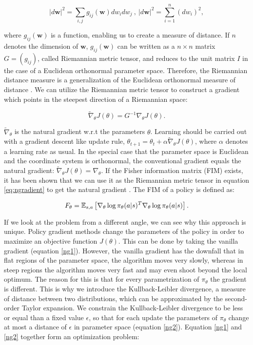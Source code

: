 \begin{equation}
	\label{eq:riem}
	|d\textbf{w}|^2 = \sum_{i,j}g_{ij}(\textbf{w}) dw_i dw_j ~,~ |d\textbf{w}|^2 = \sum_{i=1}^{n}(dw_i)^2,
\end{equation}

\noindent where $g_{ij}(\textbf{w})$ is a function, enabling us to create a measure of distance. If $n$ denotes the dimension of $\textbf{w}$, $g_{ij}(\textbf{w})$ can be written as a $n \times n$ matrix $G = (g_{ij})$, called Riemannian metric tensor, and reduces to the unit matrix $I$ in the case of a Euclidean orthonormal parameter space. Therefore, the Riemannian distance measure is a generalization of the Euclidean orthonormal measure of distance \citep{amari1998natural, haykin2009neural}. We can utilize the Riemannian metric tensor to construct a gradient which points in the steepest direction of a Riemannian space:

\begin{equation}
	\label{eq:ngradient}
	\widetilde{\nabla}_{\theta} J(\theta) = G^{-1} \nabla_\theta J(\theta).
\end{equation}

\noindent $\widetilde{\nabla}_{\theta}$ is the natural gradient w.r.t the parameters $\theta$.  Learning should be carried out with a gradient descent like update rule, $\theta_{t+1} = \theta_{t} + \alpha \widetilde{\nabla}_{\theta} J(\theta)$, where $\alpha$ denotes a learning rate as usual. In the special case that the parameter space is Euclidean and the coordinate system is orthonormal, the conventional gradient equals the natural gradient: $\widetilde{\nabla}_{\theta} J(\theta) = \nabla_{\theta}$.
If the Fisher information matrix (FIM) exists, it has been shown that we can use it as the Riemannian metric tensor in equation \ref{eq:ngradient} to get the natural gradient \citep{amari1998efficiently, peters2008natural}. The FIM of a policy is defined as:

\begin{equation}
	F_\theta=\operatorname{\mathbb{E}}_{s,a}\left[\nabla_{\theta}\log\pi_{\theta}(a|s)^{T}\nabla_{\theta}\log\pi_{\theta}(a|s)\right].
\end{equation}

\noindent If we look at the problem from a different angle, we can see why this approach is unique. Policy gradient methods change the parameters of the policy in order to maximize an objective function $J(\theta)$. This can be done by taking the vanilla gradient (equation \ref{ng1}). However, the vanilla gradient has the downfall that in flat regions of the parameter space, the algorithm moves very slowly, whereas in steep regions the algorithm moves very fast and may even shoot beyond the local optimum. The reason for this is that for every parametrization of $\pi_{\theta}$ the gradient is different. This is why we introduce the Kullback-Leibler divergence, a measure of distance between two distributions, which can be approximated by the second-order Taylor expansion. We constrain the Kullback-Leibler divergence to be less or equal than a fixed value $\epsilon$, so that for each update the parameters of $\pi_\theta$ change at most a distance of $\epsilon$ in parameter space (equation \ref{ng2}). Equation \ref{ng1} and \ref{ng2} together form an optimization problem:


